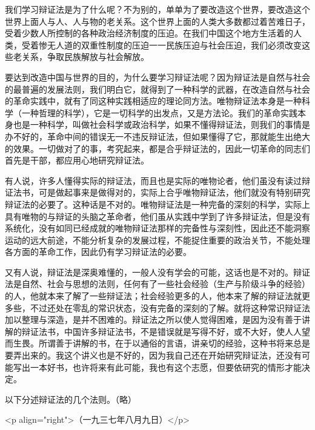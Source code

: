 我们学习辩证法是为了什么呢？不为别的，单单为了要改造这个世界，要改造这个世界上面人与人、人与物的老关系。这个世界上面的人类大多数都过着苦难日子，受着少数人所控制的各种政治经济制度的压迫。在我们中国这个地方生活着的人类，受着惨无人道的双重性制度的压迫一一民族压迫与社会压迫，我们必须改变这些老关系，争取民族解放与社会解放。

要达到改造中国与世界的目的，为什么要学习辩证法呢？因为辩证法是自然与社会的最普遍的发展法则，我们明白它，就得到了一种科学的武器，在改造自然与社会的革命实践中，就有了同这种实践相适应的理论同方法。唯物辩证法本身是一种科学（一种哲理的科学），它是一切科学的出发点，又是方法论。我们的革命实践本身也是一种科学，叫做社会科学或政治科学，如果不懂得辩证法，则我们的事情是办不好的，革命中间的错误无一不违反辩证法，但如果懂得了它，那就能生出绝大的效果。一切做对了的事，考究起来，都是合乎辩证法的，因此一切革命的同志们首先是干部，都应用心地研究辩证法。

有人说，许多人懂得实际的辩证法，而且也是实际的唯物论者，他们虽没有读过辩证法书，可是做起事来是做得对的，实际上合乎唯物辩证法，他们就没有特别研究辩证法的必要了。这种话是不对的。唯物辩证法是一种完备的深刻的科学，实际上具有唯物的与辩证的头脑之革命者，他们虽从实践中学到了许多辩证法，但是没有系统化，没有如同已经成就的唯物辩证法那样的完备性与深刻性，因此还不能洞察运动的远大前途，不能分析复杂的发展过程，不能捉住重要的政治关节，不能处理各方面的革命工作，因此仍有学习辩证法的必要。

又有人说，辩证法是深奥难懂的，一般人没有学会的可能，这话也是不对的。辩证法是自然、社会与思想的法则，任何有了一些社会经验（生产与阶级斗争的经验）的人，他就本来了解了一些辩证法；社会经验更多的人，他本来了解的辩证法就更多些，不过还处在零乱的常识状态，没有完备的深刻的了解。就将这种常识辩证法加以整理与深造，是并不困难的。辩证法之所以使人觉得困难，是因为没有善于讲解的辩证法书，中国许多辩证法书，不是错误就是写得不好，或不大好，使人人望而生畏。所谓善于讲解的书，在于以通俗的言语，讲亲切的经验，这种书将来总是要弄出来的。我这个讲义也是不好的，因为我自己还在开始研究辩证法，还没有可能写出一本好书，也许将来有此可能，我也有这个志愿，但要依研究的情形才能决定。

以下分述辩证法的几个法则。（略）

<p align="right">（一九三七年八月九日）</p>

